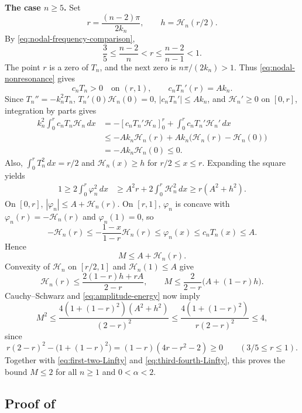 \documentclass[11pt]{amsart}
\numberwithin{equation}{section}
\theoremstyle{remark}
\begin{document}
\medskip\noindent\textbf{The case $n\ge5$.}
Set
\[
 r=\frac{(n-2)\pi}{2k_n},\qquad h=\mathcal H_n(r/2).
\]
By \eqref{eq:nodal-frequency-comparison},
\[
 \frac35\le\frac{n-2}{n}<r\le\frac{n-2}{n-1}<1.
\]
The point $r$ is a zero of $T_n$, and the next zero is
$n\pi/(2k_n)>1$. Thus \eqref{eq:nodal-nonresonance} gives
\[
 c_nT_n>0\quad\text{on }(r,1),\qquad c_nT_n'(r)=Ak_n.
\]
Since $T_n''=-k_n^2T_n$, $T_n'(0)\mathcal H_n(0)=0$,
$|c_nT_n'|\le Ak_n$, and $\mathcal H_n'\ge0$ on $[0,r]$,
integration by parts gives
\[
 \begin{aligned}
 k_n^2\int_0^r c_nT_n\mathcal H_n\,dx
 &=-[c_nT_n'\mathcal H_n]_0^r
   +\int_0^r c_nT_n'\mathcal H_n'\,dx\\
 &\le-Ak_n\mathcal H_n(r)
      +Ak_n\bigl(\mathcal H_n(r)-\mathcal H_n(0)\bigr)\\
 &=-Ak_n\mathcal H_n(0)\le0.
 \end{aligned}
\]
Also, $\int_0^rT_n^2\,dx=r/2$ and
$\mathcal H_n(x)\ge h$ for $r/2\le x\le r$. Expanding the square yields
\begin{equation}\label{eq:amplitude-energy}
 \begin{aligned}
 1\ge2\int_0^r\varphi_n^2\,dx
 &\ge A^2r+2\int_0^r\mathcal H_n^2\,dx
 \ge r(A^2+h^2).
 \end{aligned}
\end{equation}
On $[0,r]$, $|\varphi_n|\le A+\mathcal H_n(r)$.
On $[r,1]$, $\varphi_n$ is concave with
$\varphi_n(r)=-\mathcal H_n(r)$ and $\varphi_n(1)=0$, so
\[
 -\mathcal H_n(r)\le
 -\frac{1-x}{1-r}\mathcal H_n(r)\le\varphi_n(x)
 \le c_nT_n(x)\le A.
\]
Hence
\begin{equation}\label{eq:maximum-amplitude}
 M\le A+\mathcal H_n(r).
\end{equation}
Convexity of $\mathcal H_n$ on $[r/2,1]$ and
$\mathcal H_n(1)\le A$ give
\[
 \mathcal H_n(r)\le\frac{2(1-r)h+rA}{2-r},\qquad
 M\le\frac{2}{2-r}\bigl(A+(1-r)h\bigr).
\]
Cauchy--Schwarz and \eqref{eq:amplitude-energy} now imply
\begin{equation}\label{eq:uniform-two-bound}
 M^2\le\frac{4(1+(1-r)^2)(A^2+h^2)}{(2-r)^2}
 \le\frac{4(1+(1-r)^2)}{r(2-r)^2}\le4,
\end{equation}
since
\[
 r(2-r)^2-\bigl(1+(1-r)^2\bigr)
 =(1-r)(4r-r^2-2)\ge0\qquad(3/5\le r\le1).
\]
Together with \eqref{eq:first-two-Linfty} and \eqref{eq:third-fourth-Linfty},
this proves the bound $M\le2$ for all $n\ge1$ and $0<\alpha<2$.

\subsection{Proof of }
\label{subsec:nodal-counting}
\end{document}
